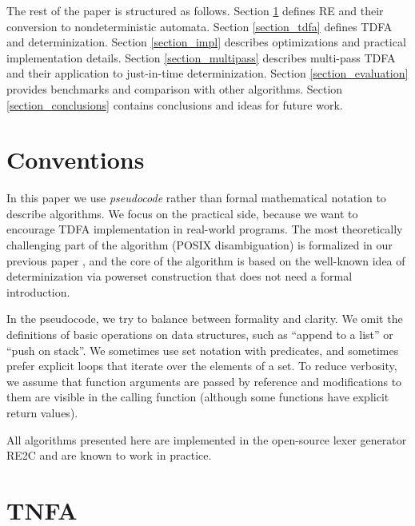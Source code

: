 \documentclass[]{article}
\begin{document}
The rest of the paper is structured as follows.
Section \ref{section_tnfa} defines RE and their conversion to nondeterministic automata.
Section \ref{section_tdfa} defines TDFA and determinization.
Section \ref{section_impl} describes optimizations and practical implementation details.
Section \ref{section_multipass} describes multi-pass TDFA and their application to just-in-time determinization.
Section \ref{section_evaluation} provides benchmarks and comparison with other algorithms.
Section \ref{section_conclusions} contains conclusions and ideas for future work.

\section*{Conventions}

In this paper we use \emph{pseudocode} rather than formal mathematical notation to describe algorithms.
We focus on the practical side, because we want to encourage TDFA implementation in real-world programs.
The most theoretically challenging part of the algorithm (POSIX disambiguation)
is formalized in our previous paper \cite{BorTro19},
and the core of the algorithm is based on the well-known idea of determinization via powerset construction
that does not need a formal introduction.
\medskip

In the pseudocode, we try to balance between formality and clarity.
We omit the definitions of basic operations on data structures, such as ``append to a list'' or ``push on stack''.
We sometimes use set notation with predicates, and sometimes prefer explicit loops that iterate over the elements of a set.
To reduce verbosity, we assume that function arguments are passed by reference and modifications to them are visible in the calling function
(although some functions have explicit return values).
\medskip

All algorithms presented here are implemented in the open-source lexer generator RE2C and are known to work in practice.

\pagebreak

\section{TNFA}\label{section_tnfa}
\end{document}
